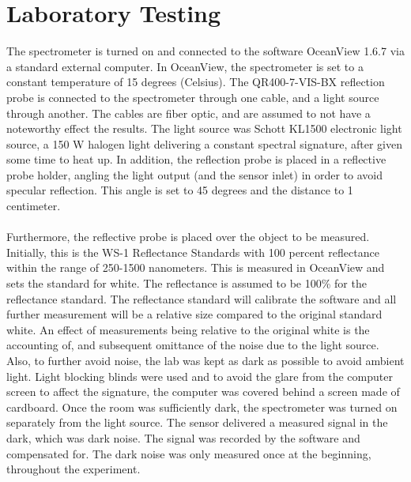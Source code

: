 \section{Laboratory Testing}
The spectrometer is turned on and connected to the software OceanView 1.6.7 via a standard external computer. In OceanView, the spectrometer is set to a constant temperature of 15 degrees (Celsius). The QR400-7-VIS-BX reflection probe is connected to the spectrometer through one cable, and a light source through another. The cables are fiber optic, and are assumed to not have a noteworthy effect the results. The light source was Schott KL1500 electronic light source, a 150 W halogen light delivering a constant spectral signature, after given some time to heat up. In addition, the reflection probe is placed in a reflective probe holder, angling the light output (and the sensor inlet) in order to avoid specular reflection. This angle is set to 45 degrees and the distance to 1 centimeter.
\\\\
Furthermore, the reflective probe is placed over the object to be measured. Initially, this is the WS-1 Reflectance Standards with 100 percent reflectance within the range of 250-1500 nanometers. This is measured in OceanView and sets the standard for white. The reflectance is assumed to be 100\% for the reflectance standard. The reflectance standard will calibrate the software and all further measurement will be a relative size compared to the original standard white. An effect of measurements being relative to the original white is the accounting of, and subsequent omittance of the noise due to the light source. Also, to further avoid noise, the lab was kept as dark as possible to avoid ambient light. Light blocking blinds were used and to avoid the glare from the computer screen to affect the signature, the computer was covered behind a screen made of cardboard. Once the room was sufficiently dark, the spectrometer was turned on separately from the light source. The sensor delivered a measured signal in the dark, which was dark noise. The signal was recorded by the software and compensated for. The dark noise was only measured once at the beginning, throughout the experiment.
\\\\
